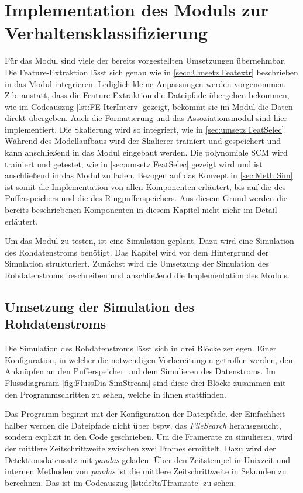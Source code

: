 \section{Implementation des Moduls zur Verhaltensklassifizierung}
Für das Modul sind viele der bereits vorgestellten Umsetzungen übernehmbar. Die Feature-Extraktion lässt sich genau wie in \ref{secc:Umsetz Featextr} beschrieben in das Modul integrieren. Lediglich kleine Anpassungen werden vorgenommen. Z.b. anstatt, dass die Feature-Extraktion die Dateipfade übergeben bekommen, wie im Codeauszug \ref{lst:FE IterInterv} gezeigt, bekommt sie im Modul die Daten direkt übergeben. Auch die Formatierung und das Assoziationsmodul sind hier implementiert. Die Skalierung wird so integriert, wie in \ref{sec:umsetz FeatSelec}. Während des Modellaufbaus wird der Skalierer trainiert und gespeichert und kann anschließend in das Modul eingebaut werden. Die polynomiale SCM wird trainiert und getestet, wie in \ref{sec:umsetz FeatSelec} gezeigt wird und ist anschließend in das Modul zu laden. Bezogen auf das Konzept in \ref{sec:Meth Sim} ist somit die Implementation von allen Komponenten erläutert, bis auf die des Pufferspeichers und die des Ringpufferspeichers. Aus diesem Grund werden die bereits beschriebenen Komponenten in diesem Kapitel nicht mehr im Detail erläutert.\par

Um das Modul zu testen, ist eine Simulation geplant. Dazu wird eine Simulation des Rohdatenstroms benötigt. Das Kapitel wird vor dem Hintergrund der Simulation strukturiert. Zunächst wird die Umsetzung der Simulation des Rohdatenstroms beschreiben und anschließend die Implementation des Moduls.

\subsection{Umsetzung der Simulation des Rohdatenstroms}
Die Simulation des Rohdatenstroms lässt sich in drei Blöcke zerlegen. Einer Konfiguration, in welcher die notwendigen Vorbereitungen getroffen werden, dem Anknüpfen an den Pufferspeicher und dem Simulieren des Datenstroms. Im Flussdiagramm \ref{fig:FlussDia SimStream} sind diese drei Blöcke zusammen mit den Programmschritten zu sehen, welche in ihnen stattfinden. \par


Das Programm beginnt mit der Konfiguration der Dateipfade. der Einfachheit halber werden die Dateipfade nicht über bspw. das \textit{FileSearch} herausgesucht, sondern explizit in den Code geschrieben. Um die Framerate zu simulieren, wird der mittlere Zeitschrittweite zwischen zwei Frames ermittelt. Dazu wird der Detektionsdatensatz mit \textit{pandas} geladen. Über den Zeitstempel in Unixzeit und internen Methoden von \textit{pandas} ist die mittlere Zeitschrittweite in Sekunden zu berechnen. Das ist im Codeauszug \ref{lst:deltaTframrate} zu sehen.

